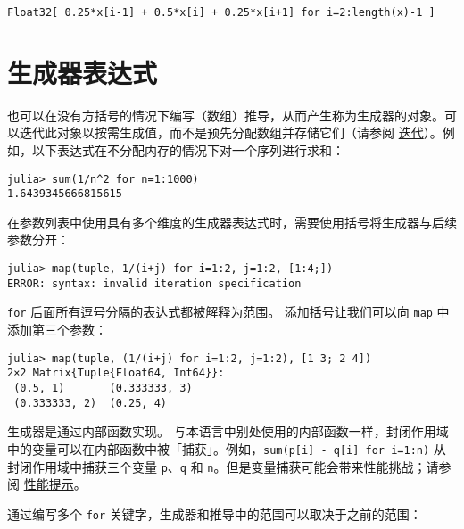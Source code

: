 \begin{verbatim}
Float32[ 0.25*x[i-1] + 0.5*x[i] + 0.25*x[i+1] for i=2:length(x)-1 ]
\end{verbatim}



\hypertarget{5737546333215614116}{}


\section{生成器表达式}



也可以在没有方括号的情况下编写（数组）推导，从而产生称为生成器的对象。可以迭代此对象以按需生成值，而不是预先分配数组并存储它们（请参阅 \hyperlink{9973578417281662233}{迭代}）。例如，以下表达式在不分配内存的情况下对一个序列进行求和：




\begin{verbatim}
julia> sum(1/n^2 for n=1:1000)
1.6439345666815615
\end{verbatim}



在参数列表中使用具有多个维度的生成器表达式时，需要使用括号将生成器与后续参数分开：




\begin{verbatim}
julia> map(tuple, 1/(i+j) for i=1:2, j=1:2, [1:4;])
ERROR: syntax: invalid iteration specification
\end{verbatim}



\texttt{for} 后面所有逗号分隔的表达式都被解释为范围。 添加括号让我们可以向 \hyperlink{11483231213869150535}{\texttt{map}} 中添加第三个参数：




\begin{verbatim}
julia> map(tuple, (1/(i+j) for i=1:2, j=1:2), [1 3; 2 4])
2×2 Matrix{Tuple{Float64, Int64}}:
 (0.5, 1)       (0.333333, 3)
 (0.333333, 2)  (0.25, 4)
\end{verbatim}



生成器是通过内部函数实现。 与本语言中别处使用的内部函数一样，封闭作用域中的变量可以在内部函数中被「捕获」。例如，\texttt{sum(p[i] - q[i] for i=1:n)} 从封闭作用域中捕获三个变量 \texttt{p}、\texttt{q} 和 \texttt{n}。但是变量捕获可能会带来性能挑战；请参阅 \hyperlink{818954303942149020}{性能提示}。



通过编写多个 \texttt{for} 关键字，生成器和推导中的范围可以取决于之前的范围：




